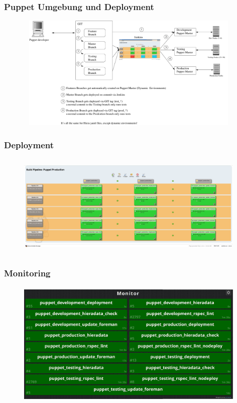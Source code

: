 \documentclass{beamer}
\begin{document}
\begin{frame}
  \frametitle{Puppet Umgebung und Deployment}
  \begin{figure}[ht]
    \centering
      \includegraphics[height=5.5cm,width=11cm]{../pics/puppet_deployment2}
  \end{figure}
\end{frame}

\begin{frame}
  \frametitle{Deployment}
  \begin{figure}[ht]
    \centering
      \includegraphics[height=5cm,width=11cm]{../pics/jenkins_pipeline}
    \label{fig:stack}
  \end{figure}
\end{frame}

\begin{frame}
  \frametitle{Monitoring}
  \begin{figure}[ht]
    \centering
      \includegraphics[height=6cm,width=11cm]{../pics/jenkins_monitor.png}
    \label{fig:stack}
  \end{figure}
\end{frame}
\end{document}
